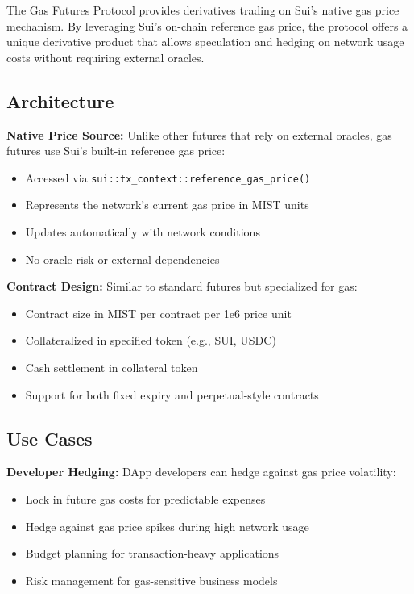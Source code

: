 \documentclass[12pt]{article}
\begin{document}
The Gas Futures Protocol provides derivatives trading on Sui's native gas price mechanism. By leveraging Sui's on-chain reference gas price, the protocol offers a unique derivative product that allows speculation and hedging on network usage costs without requiring external oracles.

\subsection{Architecture}

\textbf{Native Price Source:} Unlike other futures that rely on external oracles, gas futures use Sui's built-in reference gas price:
\begin{itemize}
    \item Accessed via \texttt{sui::tx\_context::reference\_gas\_price()}
    \item Represents the network's current gas price in MIST units
    \item Updates automatically with network conditions
    \item No oracle risk or external dependencies
\end{itemize}

\textbf{Contract Design:} Similar to standard futures but specialized for gas:
\begin{itemize}
    \item Contract size in MIST per contract per 1e6 price unit
    \item Collateralized in specified token (e.g., SUI, USDC)
    \item Cash settlement in collateral token
    \item Support for both fixed expiry and perpetual-style contracts
\end{itemize}

\subsection{Use Cases}

\textbf{Developer Hedging:} DApp developers can hedge against gas price volatility:
\begin{itemize}
    \item Lock in future gas costs for predictable expenses
    \item Hedge against gas price spikes during high network usage
    \item Budget planning for transaction-heavy applications
    \item Risk management for gas-sensitive business models
\end{itemize}
\end{document}
